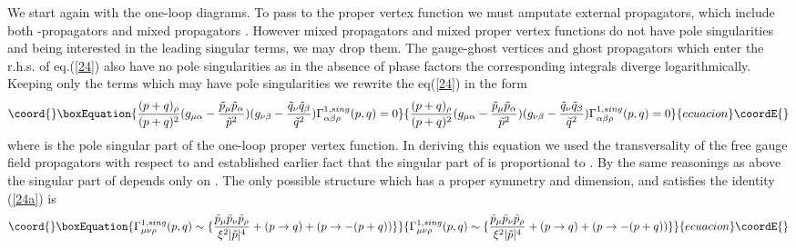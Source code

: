 \documentclass[a4paper,12pt]{article}
\begin{document}
 We start again with the one-loop diagrams. To pass to the proper vertex 
  function we must amputate external propagators, which include both 
  \coordHE{}-propagators and mixed propagators \coordHE{}. 
  However mixed propagators and mixed proper vertex functions do not have 
  pole singularities and being interested in the leading singular terms, 
 we may drop them. The gauge-ghost vertices and ghost propagators which 
 enter the r.h.s. of eq.(\ref{24}) also have no pole singularities as in 
 the absence of phase factors the corresponding integrals diverge 
 logarithmically.  Keeping only the terms which may have pole 
 singularities we rewrite the eq(\ref{24}) in the form \begin{equation}\coord{}\boxEquation{ 
\frac{(p+q)_{\rho}}{(p+q)^2}(g_{\mu \alpha}- \frac{\tilde{p}_{\mu} 
 \tilde{p}_{\alpha}}{\tilde{p}^2})(g_{\nu \beta}- \frac{\tilde{q}_{\nu} 
 \tilde{q}_{\beta}}{\tilde{q}^2}) \Gamma^{1, 
 sing}_{\alpha \beta \rho}(p,q)=0
\label{24a} 
 }{ 
\frac{(p+q)_{\rho}}{(p+q)^2}(g_{\mu \alpha}- \frac{\tilde{p}_{\mu} 
 \tilde{p}_{\alpha}}{\tilde{p}^2})(g_{\nu \beta}- \frac{\tilde{q}_{\nu} 
 \tilde{q}_{\beta}}{\tilde{q}^2}) \Gamma^{1, 
 sing}_{\alpha \beta \rho}(p,q)=0
}{ecuacion}\coordE{}\end{equation} 
where \coordHE{} is the pole singular part of the 
one-loop proper vertex function. In deriving this equation we used the 
transversality of the free gauge field propagators with respect to 
\coordHE{} and established earlier fact that the singular part of 
\coordHE{} is proportional to 
\coordHE{}. By the same reasonings as above the 
singular part of \coordHE{} depends only on \coordHE{}.  The only possible structure which has a proper 
symmetry and dimension, and satisfies the identity (\ref{24a}) is 
\begin{equation}\coord{}\boxEquation{ \Gamma^{1, sing}_{\mu \nu \rho}(p,q) \sim \{ 
\frac{\tilde{p}_{\mu} \tilde{p}_{\nu} 
 \tilde{p}_{\rho}}{\xi^2|\tilde{p}|^4}+ (p \rightarrow q)+(p \rightarrow 
 -(p+q)) \} \label{25} 
 }{ \Gamma^{1, sing}_{\mu \nu \rho}(p,q) \sim \{ 
\frac{\tilde{p}_{\mu} \tilde{p}_{\nu} 
 \tilde{p}_{\rho}}{\xi^2|\tilde{p}|^4}+ (p \rightarrow q)+(p \rightarrow 
 -(p+q)) \} }{ecuacion}\coordE{}\end{equation}
\end{document}
